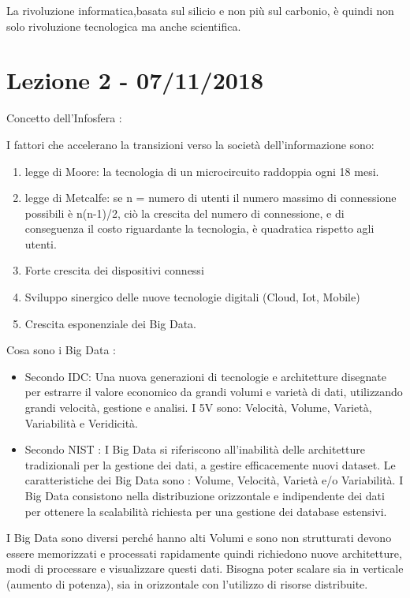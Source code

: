 \documentclass[a4page, 11pt]{article}
\begin{document}
La rivoluzione informatica,basata sul silicio e non più sul carbonio,
è quindi non solo rivoluzione tecnologica ma anche scientifica.

\section*{Lezione 2 - 07/11/2018}

Concetto dell'Infosfera :

I fattori che accelerano la transizioni verso la società
dell'informazione sono:

\begin{enumerate}
	\def\labelenumi{\arabic{enumi}.}
	 
	\item
	legge di Moore: la tecnologia di un microcircuito raddoppia ogni 18
	mesi.
	\item
	legge di Metcalfe: se n = numero di utenti il numero massimo di
	connessione possibili è n(n-1)/2, ciò la crescita del numero di
	connessione, e di conseguenza il costo riguardante la tecnologia, è
	quadratica rispetto agli utenti.
	\item
	Forte crescita dei dispositivi connessi
	\item
	Sviluppo sinergico delle nuove tecnologie digitali (Cloud, Iot,
	Mobile)
	\item
	Crescita esponenziale dei Big Data.
\end{enumerate}

Cosa sono i Big Data :

\begin{itemize}
	 
	\item
	Secondo IDC: Una nuova generazioni di tecnologie e architetture
	disegnate per estrarre il valore economico da grandi volumi e varietà
	di dati, utilizzando grandi velocità, gestione e analisi. I 5V sono:
	Velocità, Volume, Varietà, Variabilità e Veridicità.
	\item
	Secondo NIST : I Big Data si riferiscono all'inabilità delle
	architetture tradizionali per la gestione dei dati, a gestire
	efficacemente nuovi dataset. Le caratteristiche dei Big Data sono :
	Volume, Velocità, Varietà e/o Variabilità. I Big Data consistono nella
	distribuzione orizzontale e indipendente dei dati per ottenere la
	scalabilità richiesta per una gestione dei database estensivi. 
\end{itemize}


I Big Data sono diversi perché hanno alti Volumi e sono non strutturati
devono essere memorizzati e processati rapidamente quindi richiedono
nuove architetture, modi di processare e visualizzare questi dati.
Bisogna poter scalare sia in verticale (aumento di potenza),
sia in orizzontale con l'utilizzo di risorse distribuite.
\end{document}
